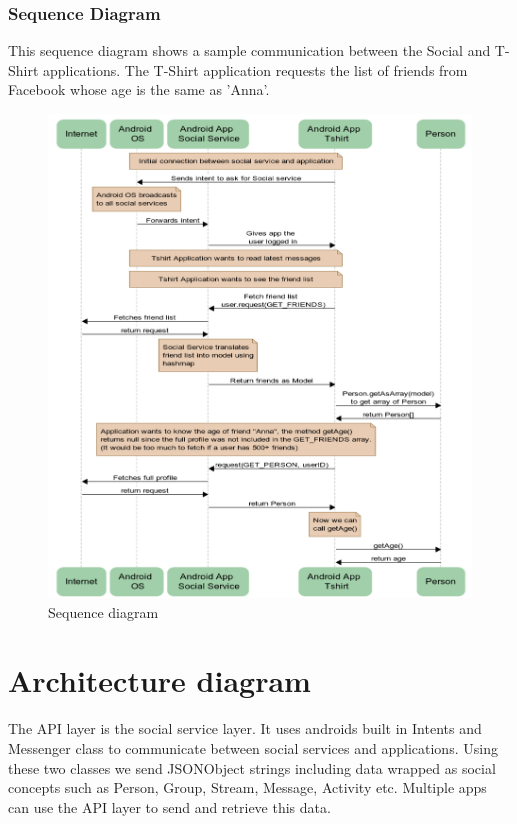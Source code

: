 \newpage

\subsubsection{Sequence Diagram}
This sequence diagram shows a sample communication between the Social and T-Shirt applications.
The T-Shirt application requests the list of friends from Facebook whose age is the same as 'Anna'.

\begin{figure}[h!]
\centering \includegraphics[width=1.0\textwidth]{img/design-sequence.png}
\caption{Sequence diagram}
\label{fig:design-sequence}
\end{figure}

\newpage

\section{Architecture diagram}
The API layer is the social service layer. It uses androids built in Intents and Messenger class to communicate between social
services and applications. Using these two classes we send JSONObject strings including data wrapped as social concepts such as Person, Group,
Stream, Message, Activity etc. Multiple apps can use the API layer to send and retrieve this data.

